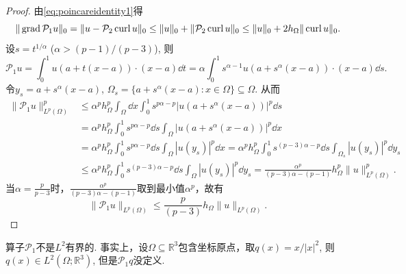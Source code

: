 \begin{proof}
由\eqref{eq:poincareidentity1}得 
$$
\|\operatorname{grad}\mathcal{P}_1u\|_0=\|u -\mathcal{P}_2\operatorname{curl} u\|_0\leq \|u\|_0+\|\mathcal{P}_2\operatorname{curl} u\|_0\leq \|u\|_0+2h_{\Omega}\|\operatorname{curl} u\|_0.
$$
设$s=t^{1/\alpha}$ ($\alpha>(p-1)/(p-3)$), 则
$$
\mathcal{P}_1u = \int_0^1u(a+t(x-a))\cdot (x-a)\dd t= \alpha\int_0^1s^{\alpha-1}u(a+s^{\alpha}(x-a))\cdot (x-a)\dd s.
$$
令$y_s=a+s^{\alpha}(x-a)$, $\Omega_s=\{a+s^{\alpha}(x-a): x\in\Omega\}\subseteq\Omega$.
从而
\begin{align*}
\|\mathcal{P}_1u\|_{L^p(\Omega)}^p&\leq\alpha^ph_{\Omega}^p\int_{\Omega}\dd x\int_0^1s^{p\alpha-p}|u(a+s^{\alpha}(x-a))|^p\dd s \\
&= \alpha^ph_{\Omega}^p\int_0^1s^{p\alpha-p}\dd s\int_{\Omega}|u(a+s^{\alpha}(x-a))|^p\dd x \\
&= \alpha^ph_{\Omega}^p\int_0^1s^{p\alpha-p}\dd s\int_{\Omega}|u(y_s)|^p\dd x= \alpha^ph_{\Omega}^p\int_0^1s^{(p-3)\alpha-p}\dd s\int_{\Omega_s}|u(y_s)|^p\dd y_s \\
&\leq \alpha^ph_{\Omega}^p\int_0^1s^{(p-3)\alpha-p}\dd s\int_{\Omega}|u(y_s)|^p\dd y_s=\frac{\alpha^p}{(p-3)\alpha-(p-1)}h_{\Omega}^p\|u\|_{L^p(\Omega)}^p.
\end{align*}
当$\alpha=\frac{p}{p-3}$时，$\frac{\alpha^p}{(p-3)\alpha-(p-1)}$取到最小值$\alpha^p$，故有
$$
\|\mathcal{P}_1u\|_{L^p(\Omega)}\leq \frac{p}{(p-3)}h_{\Omega}\|u\|_{L^p(\Omega)}.
$$
\end{proof}

\begin{remark}
算子$\mathcal{P}_1$不是$L^2$有界的. 事实上，设$\Omega\subseteq\mathbb R^3$包含坐标原点，取$q(x)=x/|x|^2$, 则$q(x)\in L^2(\Omega;\mathbb R^3)$, 但是$\mathcal{P}_1q$没定义.
\end{remark}

